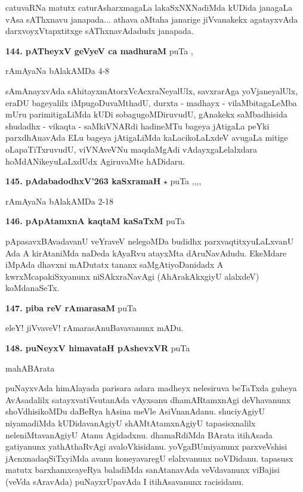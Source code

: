 catuvaRNa matutx caturAsharxmagaLa lakaSxNXNadiMda kUDida janagaLa vAsa sAThxnavu janapada... athava aMtaha janarige jiVvanakekx agatayxvAda darxvoyxVtapxtitxge sAThxnavAdadudx janapada.

\medskip
\noindent\textbf{144. pATheyxV geVyeV ca madhuraM} \hfill puTa \pageref{164a},\pageref{250}

\hfill rAmAyaNa bAlakAMDa 4-8

sAmAnayxvAda sAhitayxmAtorxVcAcxraNeyalUlx, savxrarAga yoVjaneyalUlx, eraDU bageyalilx iMpugoDuvaMthadU, durxta - madhayx - vilaMbitagaLeMba mUru parimitigaLiMda kUDi sobagugoMDiruvudU, gAnakekx saMbadhisida shudadhx - vikaqta - saMkiVNARdi hadineMTu bageya jAtigaLa peYki parxdhAnavAda ELu bageya jAtigaLiMda kaLacikoLaLxdeV avugaLa mitige oLapaTiTxruvudU, viVNAveVNu maqdaMgAdi vAdayxgaLelalxdara  hoMdANikeyuLaLxdUdx AgiruvaMte hADidaru.

\medskip
\noindent\textbf{145. pAdabadodhxV\char'263 kaSxramaH} $\star$ \hfill puTa \pageref{20b},\pageref{157a},\pageref{201},\pageref{213},\pageref{242}

\hfill rAmAyaNa bAlakAMDa 2-18

\medskip
\noindent\textbf{146. pApAtamxnA kaqtaM kaSaTxM} \hfill puTa \pageref{203a}

pApasavxBAvadavanU veYraveV nelegoMDa budidhx parxvaqtitxyuLaLxvanU Ada A kirAtaniMda naDeda kAyaRvu atayxMta dAruNavAdudu. EkeMdare iMpAda dhavxni mADutatx tananx saMgAtiyoDanidadx A kwrxMcapakiSxyanunx niSAkxraNavAgi (AhArakAkxgiyU alalxdeV) koMdanaSeTx.

\medskip
\noindent\textbf{147. piba reV rAmarasaM} \hfill puTa \pageref{187}

eleY! jiVvaveV! rAmarasAnuBavavanunx mADu. 

\medskip
\noindent\textbf{148. puNeyxV himavataH pAshevxVR} \hfill puTa \pageref{118b}

\hfill mahABArata

puNayxvAda himAlayada parisara adara madheyx nelesiruva beTaTxda guheya AvAsadalilx satayxvatiVsutanAda vAyxsanu dhamARtamxnAgi deVhavanunx shoVdhisikoMDu daBeRya hAsina meVle AsiVnanAdanu. shuciyAgiyU niyamadiMda kUDidavanAgiyU shAMtAtamxnAgiyU tapasisxnalilx neleniMtavanAgiyU Atanu Agidadxnu. dhamaRdiMda BArata itihAsada gatiyanunx yathAthaRvAgi avaloVkisidanu. yoVgaBUmiyanunx parxveVshisi jAcnxnadaqSiTxyiMda avanu koneyavaregU elalxvanunx noVDidanu. tapasusx matutx barxhamxcayeRya baladiMda sanAtanavAda veVdavanunx viBajisi (veVda sAravAda) puNayxrUpavAda I itihAsavanunx racisidanu.

